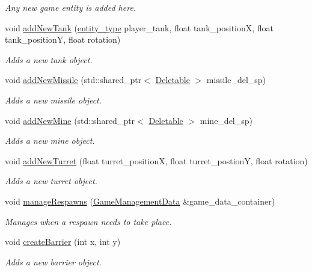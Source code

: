 \begin{DoxyCompactItemize}
\begin{DoxyCompactList}\small\item\em Any new game entity is added here. \end{DoxyCompactList}\item 
void \hyperlink{classGame_ab77bec9aa745c5fb55794d0bbed4b235}{add\-New\-Tank} (\hyperlink{Structures_8h_a6d8f83e710b27d4f86c45f0bb77066e3}{entity\-\_\-type} player\-\_\-tank, float tank\-\_\-position\-X, float tank\-\_\-position\-Y, float rotation)
\begin{DoxyCompactList}\small\item\em Adds a new tank object. \end{DoxyCompactList}\item 
void \hyperlink{classGame_a2099d667dbb4574c4c9bed31eab2abb2}{add\-New\-Missile} (std\-::shared\-\_\-ptr$<$ \hyperlink{classDeletable}{Deletable} $>$ missile\-\_\-del\-\_\-sp)
\begin{DoxyCompactList}\small\item\em Adds a new missile object. \end{DoxyCompactList}\item 
void \hyperlink{classGame_afb856cf115b4c22af456a5424a37c915}{add\-New\-Mine} (std\-::shared\-\_\-ptr$<$ \hyperlink{classDeletable}{Deletable} $>$ mine\-\_\-del\-\_\-sp)
\begin{DoxyCompactList}\small\item\em Adds a new mine object. \end{DoxyCompactList}\item 
void \hyperlink{classGame_ada424b3c51aa8eca26cc9b51c2fe3604}{add\-New\-Turret} (float turret\-\_\-position\-X, float turret\-\_\-postion\-Y, float rotation)
\begin{DoxyCompactList}\small\item\em Adds a new turret object. \end{DoxyCompactList}\item 
void \hyperlink{classGame_a50b0e861ea3d882bf20017c9c759244d}{manage\-Respawns} (\hyperlink{classGameManagementData}{Game\-Management\-Data} \&game\-\_\-data\-\_\-container)
\begin{DoxyCompactList}\small\item\em Manages when a respawn needs to take place. \end{DoxyCompactList}\item 
void \hyperlink{classGame_a14fce36a80fcf6b59d6eba6af3ee23d2}{create\-Barrier} (int x, int y)
\begin{DoxyCompactList}\small\item\em Adds a new barrier object. \end{DoxyCompactList}\item 

\end{DoxyCompactItemize}
